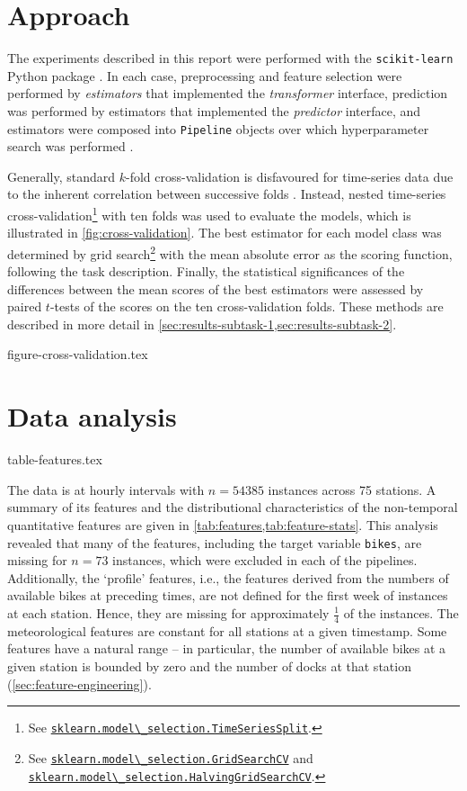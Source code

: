 \documentclass[11pt]{extarticle}
\newcommand{\sklearn}[2]{\href{https://scikit-learn.org/stable/modules/generated/sklearn.#1.#2.html}{\lstinline|sklearn.#1.#2|}}
\begin{document}
\section{Approach}
\label{sec:approach}

The experiments described in this report were performed with the \texttt{scikit-learn}
Python package \parencite{Pedregosa2011}.
In each case, preprocessing and feature selection were performed by \emph{estimators}
that implemented the \emph{transformer} interface, prediction was performed by
estimators that implemented the \emph{predictor} interface, and estimators were
composed into \texttt{Pipeline} objects over which hyperparameter search was performed
\parencite[4-9]{Buitinck2013}.

Generally, standard $k$-fold cross-validation is disfavoured for time-series data due
to the inherent correlation between successive folds \parencite{Bergmeir2018}.
Instead, nested time-series cross-validation\footnote{See
  \sklearn{model\_selection}{TimeSeriesSplit}.
} with ten folds
was used to evaluate the models, which is illustrated in \cref{fig:cross-validation}.
The best estimator for each model class was determined by grid search\footnote{See
  \sklearn{model\_selection}{GridSearchCV} and
  \sklearn{model\_selection}{HalvingGridSearchCV}.
} with the mean absolute
error as the scoring function, following the task description.
Finally, the statistical significances of the differences between the mean scores of
the best estimators were assessed by paired $t$-tests of the scores on the ten
cross-validation folds.
These methods are described in more detail in
\cref{sec:results-subtask-1,sec:results-subtask-2}.

{figure-cross-validation.tex}

\section{Data analysis}
\label{sec:data-analysis}

{table-features.tex}

The data is at hourly intervals with $n = 54385$ instances across 75 stations.
A summary of its features and the distributional characteristics of the non-temporal
quantitative features are given in \cref{tab:features,tab:feature-stats}.
This analysis revealed that many of the features, including the target variable
\texttt{bikes}, are missing for $n = 73$ instances, which were excluded in each of the
pipelines.
Additionally, the `profile' features, i.e., the features derived from the numbers of
available bikes at preceding times, are not defined for the first week of instances at
each station.
Hence, they are missing for approximately $\frac{1}{4}$ of the instances.
The meteorological features are constant for all stations at a given timestamp. Some
features have a natural range -- in particular, the number of available bikes at a
given station is bounded by zero and the number of docks at that station
(\cref{sec:feature-engineering}).
\end{document}
